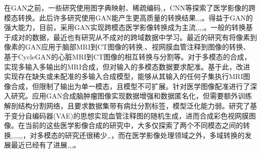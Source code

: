 \documentclass[letterpaper]{article} %
\begin{document}
在GAN之前，一些研究使用图字典映射\cite{22burgos2015robust}、稀疏编码\cite{33huang2017simultaneous},\cite{34vemulapalli2015unsupervised}，CNN\cite{36vannguyen2015crossdomain}等探索了医学影像的跨模态转换。此后许多研究使用GAN能产生更高质量的转换结果\cite{1zhao2018modular},\cite{5liang2018generative},\cite{6zhu2017unpaired},\cite{13choi2018stargan:}。得益于GAN的强大能力，目前，采用GAN实现跨模态医学影像转换成为主流\cite{2zhang2018translating},\cite{20nie2017medical},\cite{35osokin2017gans},\cite{36vannguyen2015crossdomain},\cite{40kamnitsas2017unsupervised}。一般的转换基于成对的数据，最近也有研究从不成对的跨域数据中学习\cite{2zhang2018translating}。最近的研究有将像素到像素的GAN应用于脑部MRI到CT图像的转换\cite{20nie2017medical},\cite{40kamnitsas2017unsupervised}、视网膜血管注释到图像的转换\cite{41costa2017towards}、基于CycleGAN\cite{6zhu2017unpaired}的心脏MRI到CT图像的相互转换与分割\cite{20nie2017medical}等。对于多模态的合成，\cite{84chartsias2018multimodal}实现多输入多输出的MRI合成，但对输入的多模态数据要求配准。基于此，\cite{85joyce2017robust}改进实现存在缺失或未配准的多输入合成模型，能够从其输入的任何子集执行MRI图像合成，但限制了输出为单一模态，且模型不可扩展。\cite{66miao2018dilated}针对医学图像配准进行了深入研究。\cite{4shin2018medical}应用GAN合成脑肿瘤图像实现数据增强和数据匿名化，但需要额外训练解剖结构分割网络，且要求数据集带有病灶分割标签，模型泛化能力弱。\cite{41costa2017towards}研究了基于变分自编码器(VAE)\cite{87kingma2014auto-encoding,88rezende2014stochastic}的思想实现血管注释图的随机生成，进而合成彩色视网膜图像。在当前的这些医学影像合成的研究中，大多仅探索了两个不同模态之间的转换\cite{2zhang2018translating},\cite{20nie2017medical},\cite{22burgos2015robust},\cite{34vemulapalli2015unsupervised},\cite{35osokin2017gans},\cite{36vannguyen2015crossdomain},\cite{40kamnitsas2017unsupervised}，对多模态的研究还很稀少\cite{84chartsias2018multimodal},\cite{85joyce2017robust},\cite{4shin2018medical}，而在医学影像处理领域之外，多域转换的发展最近已经有了进展\cite{1zhao2018modular},\cite{5liang2018generative},\cite{13choi2018stargan:},\cite{27isola2017image-to-image}。
\end{document}
